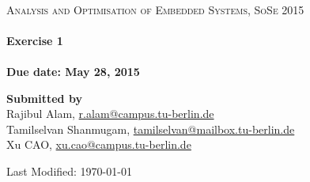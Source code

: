 \begin{titlepage}
\begin{center}

~\\[3cm]
\textsc{\Large Analysis and Optimisation of Embedded Systems,
SoSe 2015}\\[1.5cm]

\HRule \\[0.5cm]
{ \huge \bfseries Exercise 1 \\[0.4cm] }
\HRule \\[0.5cm]
\textbf{Due date: May 28, 2015}

\vfill
\begin{flushleft}
\textbf{Submitted by} \\[0.3cm]
Rajibul Alam, 
\href{mailto:r.alam@campus.tu-berlin.de}{r.alam@campus.tu-berlin.de} \\
Tamilselvan Shanmugam, 
\href{mailto:tamilselvan@mailbox.tu-berlin.de}{tamilselvan@mailbox.tu-berlin.de} \\
Xu CAO,
\href{mailto:xu.cao@campus.tu-berlin.de}{xu.cao@campus.tu-berlin.de} \\
\end{flushleft}

\vspace{1cm}
\begin{flushright}
{\large Last Modified: \today}
\end{flushright}
\end{center}

\end{titlepage}
